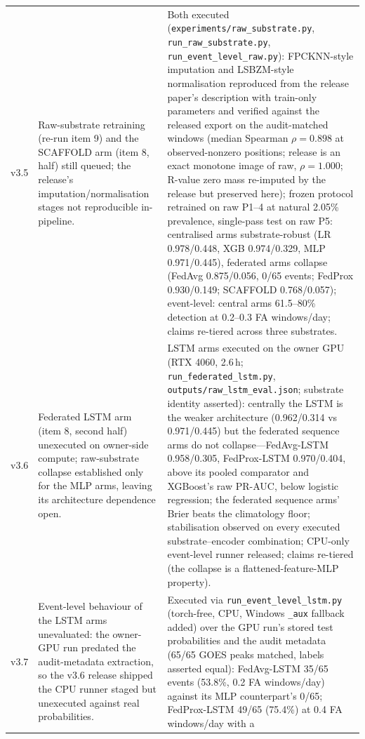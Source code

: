 \begin{longtable}{@{}p{} >{\raggedright\arraybackslash}p{} >{\raggedright\arraybackslash}p{}@{}}
v3.5 & Raw-substrate retraining (re-run item 9) and the SCAFFOLD arm
(item 8, half) still queued; the release's imputation/normalisation
stages not reproducible in-pipeline. & Both executed
(\texttt{experiments/raw\_substrate.py},
\texttt{run\_raw\_substrate.py},
\texttt{run\_event\_level\_raw.py}): FPCKNN-style imputation and
LSBZM-style normalisation reproduced from the release paper's
description with train-only parameters and verified against the
released export on the audit-matched windows (median Spearman
$\rho=0.898$ at observed-nonzero positions; release is an exact
monotone image of raw, $\rho=1.000$; R-value zero mass re-imputed
by the release but preserved here); frozen protocol retrained on
raw P1--4 at natural 2.05\% prevalence, single-pass test on raw P5:
centralised arms substrate-robust (LR 0.978/0.448, XGB 0.974/0.329,
MLP 0.971/0.445), federated arms collapse (FedAvg 0.875/0.056, 0/65
events; FedProx 0.930/0.149; SCAFFOLD 0.768/0.057); event-level:
central arms 61.5--80\% detection at 0.2--0.3 FA windows/day; claims
re-tiered across three substrates. \\
\addlinespace[2pt]
v3.6 & Federated LSTM arm (item 8, second half) unexecuted on
owner-side compute; raw-substrate collapse established only for the
MLP arms, leaving its architecture dependence open. & LSTM arms
executed on the owner GPU (RTX 4060, 2.6\,h;
\texttt{run\_federated\_lstm.py},
\texttt{outputs/raw\_lstm\_eval.json}; substrate identity asserted):
centrally the LSTM is the weaker architecture (0.962/0.314 vs
0.971/0.445) but the federated sequence arms do not
collapse---FedAvg-LSTM 0.958/0.305, FedProx-LSTM 0.970/0.404, above
its pooled comparator and XGBoost's raw PR-AUC, below logistic
regression; the federated sequence arms' Brier beats the
climatology floor; stabilisation observed on every executed
substrate--encoder combination;
CPU-only event-level runner released; claims re-tiered (the collapse
is a flattened-feature-MLP property). \\
\addlinespace[2pt]
v3.7 & Event-level behaviour of the LSTM arms unevaluated: the
owner-GPU run predated the audit-metadata extraction, so the v3.6
release shipped the CPU runner staged but unexecuted against real
probabilities. & Executed via \texttt{run\_event\_level\_lstm.py}
(torch-free, CPU, Windows \texttt{\_aux} fallback added) over the
GPU run's stored test probabilities and the audit metadata (65/65
GOES peaks matched, labels asserted equal): FedAvg-LSTM 35/65
events (53.8\%, 0.2 FA windows/day) against its MLP counterpart's
0/65; FedProx-LSTM 49/65 (75.4\%) at 0.4 FA windows/day with a

\end{longtable}

